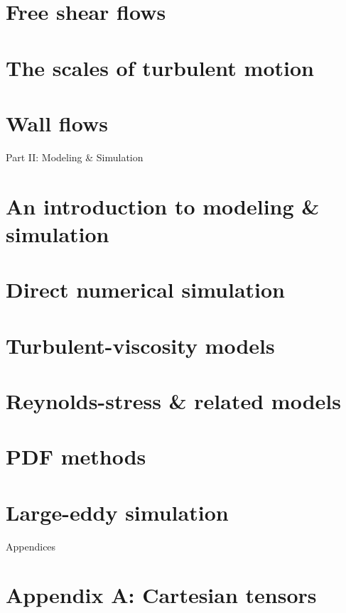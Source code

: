 \documentclass[oneside]{book}
\numberwithin{equation}{section}
\begin{document}
\section{Free shear flows}

\section{The scales of turbulent motion}

\section{Wall flows}

\begin{center}\huge
	Part II: Modeling \& Simulation
\end{center}

\section{An introduction to modeling \& simulation}

\section{Direct numerical simulation}

\section{Turbulent-viscosity models}

\section{Reynolds-stress \& related models}

\section{PDF methods}

\section{Large-eddy simulation}

\begin{center}\huge
	Appendices
\end{center}

\section{Appendix A: Cartesian tensors}
\end{document}
